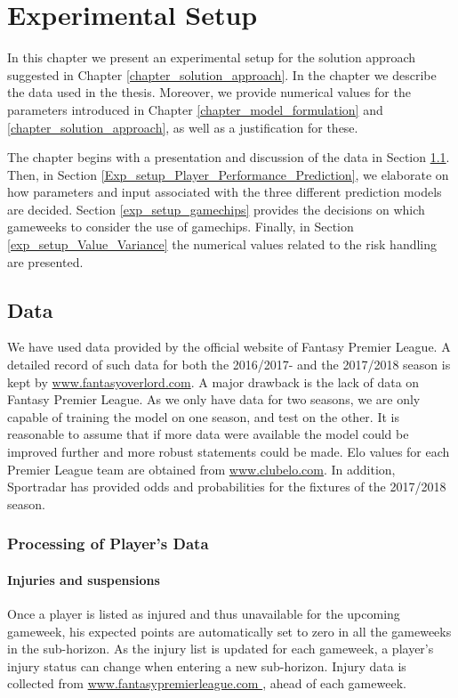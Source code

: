 \chapter{Experimental Setup}\label{chapter_experimental_setup}

In this chapter we present an experimental setup for the solution approach suggested in Chapter \ref{chapter_solution_approach}. In the chapter we describe the data used in the thesis. Moreover, we provide numerical values for the parameters introduced in Chapter \ref{chapter_model_formulation} and \ref{chapter_solution_approach}, as well as a justification for these. 

\newpar

The chapter begins with a presentation and discussion of the data in Section \ref{exp_setup_data}. Then, in Section \ref{Exp_setup_Player_Performance_Prediction}, we elaborate on how parameters and input associated with the three different prediction models are decided. Section \ref{exp_setup_gamechips} provides the decisions on which gameweeks to consider the use of gamechips. Finally, in Section \ref{exp_setup_Value_Variance} the numerical values related to the risk handling are presented.

\section{Data} \label{exp_setup_data}
We have used data provided by the official website of Fantasy Premier League. A detailed record of such data for both the 2016/2017- and the 2017/2018 season is kept by \url{www.fantasyoverlord.com}. A major drawback is the lack of data on Fantasy Premier League. As we only have data for two seasons, we are only capable of training the model on one season, and test on the other. It is reasonable to assume that if more data were available the model could be improved further and more robust statements could be made. Elo values for each Premier League team are obtained from \url{www.clubelo.com}. In addition, Sportradar has provided odds and probabilities for the fixtures of the 2017/2018 season. 

\subsection{Processing of Player's Data}

\subsubsection{Injuries and suspensions}
Once a player is listed as injured and thus unavailable for the upcoming gameweek, his expected points are automatically set to zero in all the gameweeks in the sub-horizon. As the injury list is updated for each gameweek, a player's injury status can change when entering a new sub-horizon. Injury data is collected from \url{www.fantasypremierleague.com }, ahead of each gameweek. 


